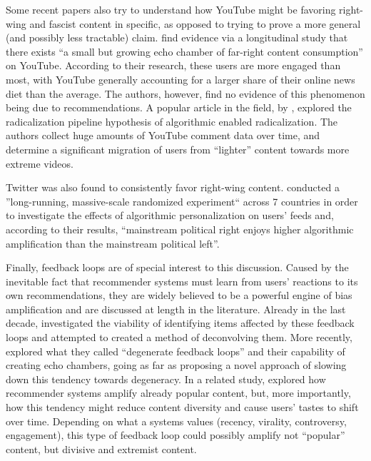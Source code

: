 Some recent papers also try to understand how YouTube might be favoring
right-wing and fascist content in specific, as opposed to trying to prove a more
general (and possibly less tractable) claim.
\citet{hosseinmardi_evaluating_2020} find evidence via a longitudinal study that
there exists ``a small but growing echo chamber of far-right content
consumption'' on YouTube. According to their research, these users are more
engaged than most, with YouTube generally accounting for a larger share of their
online news diet than the average. The authors, however, find no evidence of
this phenomenon being due to recommendations. A popular article in the field, by
\citet{ribeiro_auditing_2020}, explored the radicalization pipeline hypothesis
of algorithmic enabled radicalization. The authors collect huge amounts of
YouTube comment data over time, and determine a significant migration of users
from ``lighter'' content towards more extreme videos.

Twitter was also found to consistently favor right-wing content.
\citet{huszar_algorithmic_2021} conducted a ''long-running, massive-scale
randomized experiment`` across 7 countries in order to investigate the effects
of algorithmic personalization on users' feeds and, according to their results,
``mainstream political right enjoys higher algorithmic amplification than the
mainstream political left''.

Finally, feedback loops are of special interest to this discussion. Caused by
the inevitable fact that recommender systems must learn from users' reactions to
its own recommendations, they are widely believed to be a powerful engine of
bias amplification and are discussed at length in the literature. Already in the
last decade, \citet{sinha_deconvolving_2017} investigated the viability of
identifying items affected by these feedback loops and attempted to created a
method of deconvolving them. More recently, \citet{jiang_degenerate_2019}
explored what they called ``degenerate feedback loops'' and their capability of
creating echo chambers, going as far as proposing a novel approach of slowing
down this tendency towards degeneracy. In a related study,
\citet{mansoury_feedback_2020} explored how recommender systems amplify already
popular content, but, more importantly, how this tendency might reduce content
diversity and cause users' tastes to shift over time. Depending on what a
systems values (recency, virality, controversy, engagement), this type of
feedback loop could possibly amplify not ``popular'' content, but divisive and
extremist content.

